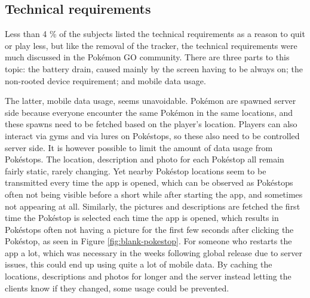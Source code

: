 \subsection{Technical requirements}
\label{sec:quitting-reasons-technical-requirements}
Less than 4 \% of the subjects listed the technical requirements as a reason to quit or play less, but like the removal of the tracker, the technical requirements were much discussed in the Pokémon GO community. There are three parts to this topic: the battery drain, caused mainly by the screen having to be always on; the non-rooted device requirement; and mobile data usage.

The latter, mobile data usage, seems unavoidable. Pokémon are spawned server side because everyone encounter the same Pokémon in the same locations, and these spawns need to be fetched based on the player's location. Players can also interact via gyms and via lures on Pokéstops, so these also need to be controlled server side. It is however possible to limit the amount of data usage from Pokéstops. The location, description and photo for each Pokéstop all remain fairly static, rarely changing. Yet nearby Pokéstop locations seem to be transmitted every time the app is opened, which can be observed as Pokéstops often not being visible before a short while after starting the app, and sometimes not appearing at all. Similarly, the pictures and descriptions are fetched the first time the Pokéstop is selected each time the app is opened, which results in Pokéstops often not having a picture for the first few seconds after clicking the Pokéstop, as seen in Figure \ref{fig:blank-pokestop}. For someone who restarts the app a lot, which was necessary in the weeks following global release due to server issues, this could end up using quite a lot of mobile data. By caching the locations, descriptions and photos for longer and the server instead letting the clients know if they changed, some usage could be prevented.

